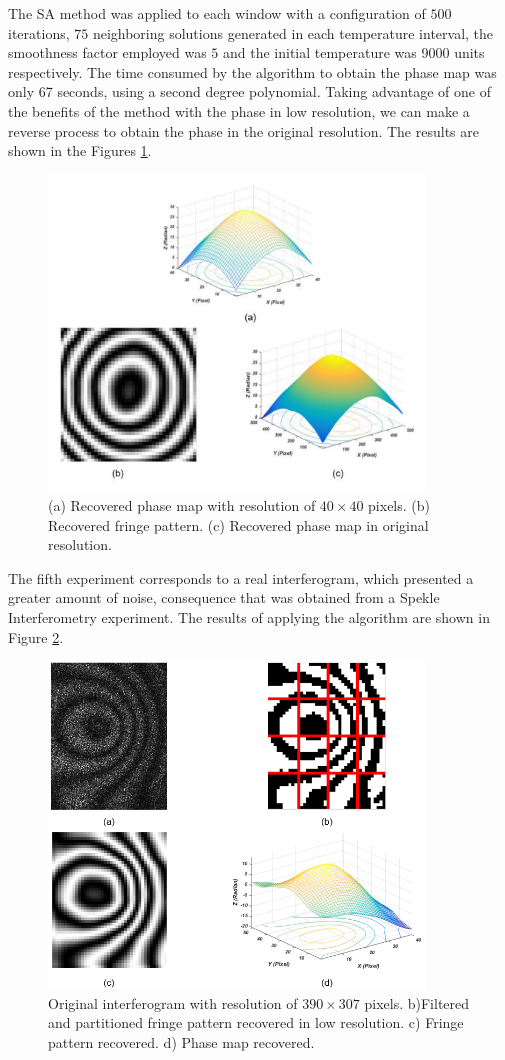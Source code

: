 \documentclass[review]{elsarticle}
\begin{document}
The SA method was applied to each window with a configuration of $500$ iterations, $75$ neighboring solutions generated in each temperature interval, the smoothness factor employed was $5$  and the initial temperature was 9000 units respectively. The time consumed by the algorithm to obtain the phase map was only 67 seconds, using a second degree polynomial. Taking advantage of one of the benefits of the method with the phase in low resolution, we can make a reverse process to obtain the phase in the original resolution. The results are shown in the Figures \ref{Fig13}.

\begin{figure}[ht!]
\centering\includegraphics[width=10cm]{fig13}
\caption{(a) Recovered phase map with resolution of $40\times40$ pixels. (b) Recovered fringe pattern. (c) Recovered phase map in original resolution.}
\label{Fig13}
\end{figure}

The fifth experiment corresponds to a real interferogram, which presented a greater amount of noise, consequence that was obtained from a Spekle Interferometry experiment. The results of applying the algorithm are shown in Figure \ref{Fig14}.

\begin{figure}[ht!]
\centering\includegraphics[width=10cm]{fig14}
\caption{Original interferogram with resolution of $390\times307$ pixels. b)Filtered and partitioned fringe pattern recovered in low resolution. c) Fringe pattern recovered. d) Phase map recovered.}
\label{Fig14}
\end{figure}
\end{document}
